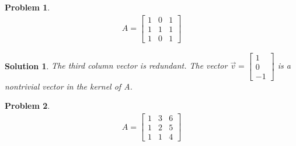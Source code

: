 \documentclass{article}
\newtheorem{problem}{Problem}
\newtheorem*{solution}{Solution}
\begin{document}
\begin{problem}
\begin{align*}
A = \begin{bmatrix}1 & 0 & 1 \\ 1 & 1 & 1 \\ 1 & 0 & 1 \end{bmatrix}
\end{align*}
\end{problem}

\begin{solution}
The third column vector is redundant. The vector $\vec{v} = \begin{bmatrix} 1 \\ 0 \\ -1 \end{bmatrix}$ is a nontrivial vector in the kernel of A.
\end{solution}

\begin{problem}
\begin{align*}
A = \begin{bmatrix}1 & 3 & 6 \\ 1 & 2 & 5 \\ 1 & 1 & 4 \end{bmatrix}
\end{align*}
\end{problem}
\end{document}
